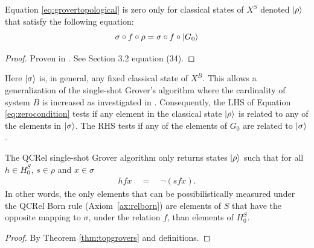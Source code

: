 \begin{theorem}
\label{thm:topgrovers}
Equation \ref{eq:grovertopological} is zero only for classical states of $X^S$ denoted $| \rho \rangle$ that satisfy the following equation:
\begin{equation}
\label{eq:zerocondition}
\sigma \circ f \circ \rho = \sigma \circ f \circ | G_0 \rangle
\end{equation}
\end{theorem}
\begin{proof}
Proven in \cite{vicary-tqa}. See Section 3.2 equation (34).
\end{proof}

Here $| \sigma \rangle$ is, in general, any fixed classical state of $X^B$. This allows a generalization of the single-shot Grover's algorithm where the cardinality of system $B$ is increased as investigated in \cite{vicary-tqa}.
Consequently, the LHS of Equation \ref{eq:zerocondition} tests if any element in the classical state $| \rho \rangle$ is related to any of the elements in $| \sigma \rangle$. The RHS tests if any of the elements of $G_0$ are related to $| \sigma \rangle$.

\begin{proposition}
The QCRel single-shot Grover algorithm only returns states $| \rho \rangle$ such that for all $h \in H^S_0$, $s\in\rho$ and $x\in \sigma$
\begin{align*}
h f x \quad = \quad \neg(s f x) .
\end{align*}
In other words, the only elements that can be possibilistically measured under the QCRel Born rule (Axiom~\ref{ax:relborn}) are elements of $S$ that have the opposite mapping to $\sigma$, under the relation $f$, than elements of $H^{S}_0$.
\end{proposition}
\begin{proof}
By Theorem \ref{thm:topgrovers} and definitions.
\end{proof}

